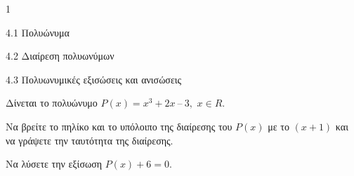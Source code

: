 \begin{ylh}{1}
\item 4.1 Πολυώνυμα
\item 4.2 Διαίρεση πολυωνύμων
\item 4.3 Πολυωνυμικές εξισώσεις και ανισώσεις
\end{ylh}
Δίνεται το πολυώνυμο $P(x) = x^{3} + 2x\ –\ 3,$ $x \in R$.
\begin{alist}
\item Να βρείτε το πηλίκο και το υπόλοιπο της διαίρεσης του $P(x)$ με το $(x + 1)$ και να γράψετε την ταυτότητα της διαίρεσης.
\item Να λύσετε την εξίσωση $P(x) + 6 = 0$.
\end{alist}

